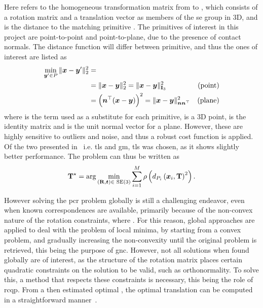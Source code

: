 Here  refers to the homogeneous transformation matrix  from  to , which consists of a rotation matrix  and a translation vector  as members of the \gls{se} group in 3D, and  is the distance to the matching primitive . The primitives of interest in this project are point-to-point and point-to-plane, due to the presence of contact normals. The distance function will differ between primitive, and thus the ones of interest are listed as
%
\begin{align}\label{eq:distance-functions}
	\min_{\vec{y}'\in P} \|\vec{x}-\vec{y}'\|^2_2 &=  \\
		& =\|\vec{x}-\vec{y}\|_2^2=\|\vec{x} - \vec{y}\|_{\mat{I}_3}^2 & \text{(point)} \\
		& = \left( \vec{n}^\T (\vec{x} - \vec{y}) \right)^2=\|\vec{x}-\vec{y}\|^2_{\vec{n}\vec{n}^\T} & \text{(plane)}
\end{align}
where  is the term used as a substitute for each primitive,  is a 3D point,  is the identity matrix and  is the unit normal vector for a plane. However, these are highly sensitive to outliers and noise, and thus a robust cost function \mvar{\rho(\cdot)} is applied. Of the two presented in~\cite{graduated-non-convexity-for-robust-spatial-perception:-from-non-minimal-solvers-to-global-outlier-rejection} i.e. \gls{tls} and \gls{gm}, \gls{tls} was chosen, as it shows slightly better performance. The problem can thus be written as
%
\begin{equation}\label{eq:point-cloud-registration-problem-robust}
		\tf[T]{\star}{} = \arg \min_{(\mat{R},\vec{t})\in\SE (3)} \sum^M_{i=1} \rho\left(d_{P_i}\left( \vec{x}_i, \mat{T} \right)^{2}\right).
\end{equation}

However solving the \gls{pcr} problem globally is still a challenging endeavor, even when known correspondences are available, primarily because of the non-convex nature of the rotation constraints, where . For this reason, global approaches are applied to deal with the problem of local minima, by starting from a convex problem, and gradually increasing the non-convexity until the original problem is retrieved, this being the purpose of \gls{gnc}. However, not all solutions when found globally are of interest, as the structure of the rotation matrix places certain quadratic constraints on the solution to be valid, such as orthonormality. To solve this, a method that respects these constraints is necessary, this being the role of \gls{rcqp}. From a then estimated optimal , the optimal translation  can be computed in a straightforward manner~\cite{convex-global-3d-registration-with-lagrangian-duality}.

